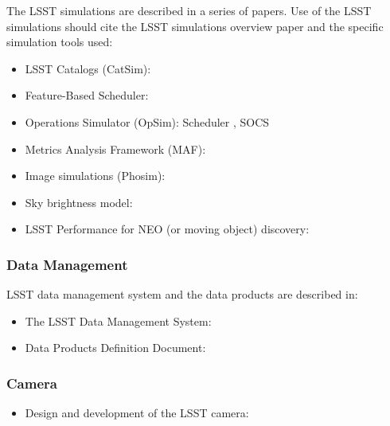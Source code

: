 The LSST simulations are described in a series of papers. Use of the LSST simulations should cite the LSST simulations overview paper \cite{2014SPIE.9150E..14C} and the specific simulation tools used:

\begin{itemize}
\item LSST Catalogs (CatSim): \cite{2014SPIE.9150E..14C}
\item Feature-Based Scheduler: \cite{2018arXiv181004815N}
\item Operations Simulator (OpSim): Scheduler \cite{2016SPIE.9910E..13D}, SOCS \cite{2016SPIE.9911E..25R}
\item Metrics Analysis Framework (MAF): \cite{2014SPIE.9149E..0BJ}
\item Image simulations (Phosim): \cite{2015ApJS..218...14P}
\item Sky brightness model: \cite{2016SPIE.9910E..1AY}
\item LSST Performance for NEO (or moving object) discovery: \cite{2018Icar..303..181J}
\end{itemize}


\subsubsection{Data Management}

LSST data management system and the data products are described in:

\begin{itemize}
  \item The LSST Data Management System: \cite{2015arXiv151207914J}
  \item Data Products Definition Document: \cite{LSE-163}
\end{itemize}


\subsubsection{Camera}

\begin{itemize}
   \item Design and development of the LSST camera: \cite{2010SPIE.7735E..0JK}
\end{itemize}


